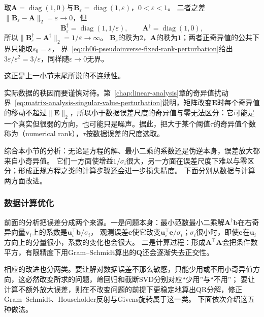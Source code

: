\begin{example}[反例：秩改变时伪逆不连续]
\label{ex:ls-pinv-discontinuity}
取$\bm A=\operatorname{diag}(1,0)$与$\bm B_\varepsilon=\operatorname{diag}(1,\varepsilon)$，$0<\varepsilon<1$。
二者之差$\lVert\bm B_\varepsilon-\bm A\rVert_2=\varepsilon\to0$，但
\[
 \bm B_\varepsilon^\dagger=\operatorname{diag}(1,1/\varepsilon),\qquad \bm A^\dagger=\operatorname{diag}(1,0),
\]
所以$\lVert\bm B_\varepsilon^\dagger-\bm A^\dagger\rVert_2=1/\varepsilon\to\infty$。
$\bm B_\varepsilon$的秩为$2$，$\bm A$的秩为$1$；两者正奇异值的公共下界只能取$s_0=\varepsilon$，
界~\eqref{eq:ch06-pseudoinverse-fixed-rank-perturbation}给出$3\varepsilon/\varepsilon^2=3/\varepsilon$，同样随$\varepsilon\to0$无界。
\end{example}

这正是上一小节末尾所说的不连续性。

实际数据的秩因而要谨慎对待。第~\ref{chap:linear-analysis}章的奇异值扰动界~\eqref{eq:matrix-analysis-singular-value-perturbation}说明，矩阵改变$\bm E$时每个奇异值的移动不超过$\lVert\bm E\rVert_2$，所以小于数据误差尺度的奇异值与零无法区分：它可能是一个真实但很弱的方向，也可能只是噪声。据此，把大于某个阈值$\tau$的奇异值个数称为（numerical rank），$\tau$按数据误差的尺度选取。

综合本小节的分析：无论是方程的解、最小二乘的系数还是伪逆本身，误差放大都来自小奇异值。
它们一方面使增益$1/\sigma_i$很大，另一方面在误差尺度下难以与零区分；形成正规方程之类的计算步骤还会进一步损失精度。
下面分别从数据与计算两方面改进。

\subsubsection{数据计算优化}
\label{sec:ls-truncated-svd-ridge}

前面的分析把误差分成两个来源。一是问题本身：最小范数最小二乘解$\bm A^\dagger\bm b$在右奇异向量$\bm v_i$上的系数是$\bm u_i^\top\bm b/\sigma_i$，
观测误差$\bm e$使它改变$\bm u_i^\top\bm e/\sigma_i$；$\sigma_i$很小时，即使$\bm e$在$\bm u_i$方向上的分量很小，系数的变化也会很大。
二是计算过程：形成$\bm A^\top\bm A$会把条件数平方，有限精度下用Gram--Schmidt算出的$\bm Q$还会逐渐失去正交性。

相应的改进也分两类。要让解对数据误差不那么敏感，只能少用或不用小奇异值方向，这必然改变所求的问题，岭回归和截断SVD分别对应“少用”与“不用”；
要让计算不额外放大误差，则在不改变问题的前提下更稳定地算出QR分解，修正Gram--Schmidt、Householder反射与Givens旋转属于这一类。
下面依次介绍这五种做法。

